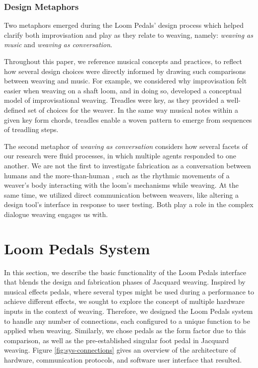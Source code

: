 \subsubsection{Design Metaphors}

Two metaphors emerged during the Loom Pedals' design process which helped clarify both improvisation and play as they relate to weaving, namely: \textit{weaving as music} and \textit{weaving as conversation}.

Throughout this paper, we reference musical concepts and practices, to reflect how several design choices were directly informed by drawing such comparisons between weaving and music. For example, we considered why improvisation felt easier when weaving on a shaft loom, and in doing so, developed a conceptual model of improvisational weaving. Treadles were key, as they provided a well-defined set of choices for the weaver. In the same way musical notes within a given key form chords, treadles enable a woven pattern to emerge from sequences of treadling steps. 

The second metaphor of \textit{weaving as conversation} considers how several facets of our research were fluid processes, in which multiple agents responded to one another. We are not the first to investigate fabrication as a conversation between humans and the more-than-human \cite{kim_shall_2017, kim_machines_2017}, such as the rhythmic movements of a weaver's body interacting with the loom's mechanisms while weaving. At the same time, we utilized direct communication between weavers, like altering a design tool's interface in response to user testing. Both play a role in the complex dialogue weaving engages us with. 

\section{Loom Pedals System}

In this section, we describe the basic functionality of the Loom Pedals interface that blends the design and fabrication phases of Jacquard weaving. Inspired by musical effects pedals, where several types might be used during a performance to achieve different effects, we sought to explore the concept of multiple hardware inputs in the context of weaving. Therefore, we designed the Loom Pedals system to handle any number of connections, each configured to a unique function to be applied when weaving. Similarly, we chose pedals as the form factor due to this comparison, as well as the pre-established singular foot pedal in Jacquard weaving. Figure \ref{fig:sys-connections} gives an overview of the architecture of hardware, communication protocols, and software user interface that resulted.

